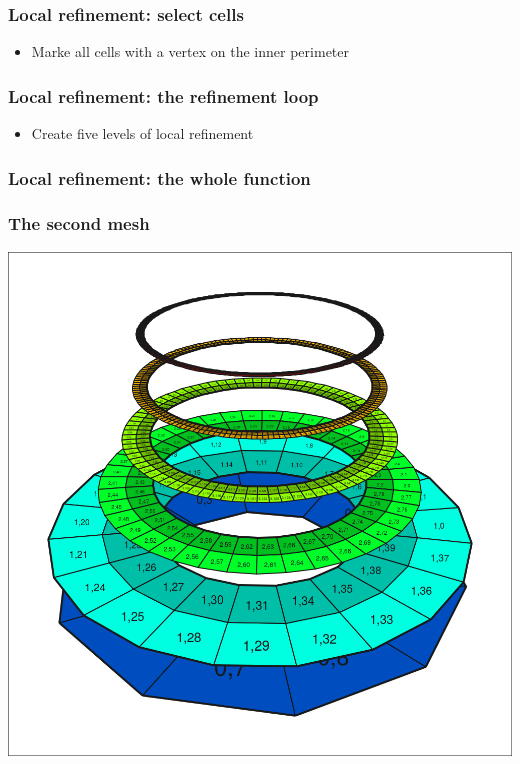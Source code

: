 \begin{frame}
  \frametitle{Local refinement: select cells}
  \begin{block}{}
        
  \end{block}
  
  \begin{itemize}
  \item Marke all cells with a vertex on the inner perimeter
  \end{itemize}
\end{frame}

\begin{frame}
  \frametitle{Local refinement: the refinement loop}
  \begin{block}{}
        
  \end{block}

  \begin{itemize}
  \item Create five levels of local refinement
  \end{itemize}
\end{frame}

\begin{frame}
  \frametitle{Local refinement: the whole function}
  \footnotesize
\end{frame}

\begin{frame}
  \frametitle{The second mesh}
  \begin{center}
    \includegraphics[height=.8\textheight]{graph/step1-2a}
  \end{center}  
\end{frame}

